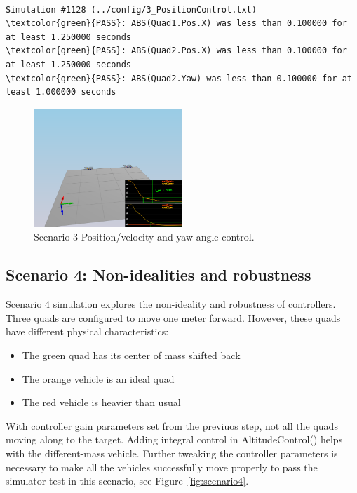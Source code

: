\documentclass[letterpaper]{article}
\begin{document}
\begin{Verbatim}[frame=lines, label=Simulator Test Result Output, commandchars=\\\{\}]

Simulation #1128 (../config/3_PositionControl.txt)
\textcolor{green}{PASS}: ABS(Quad1.Pos.X) was less than 0.100000 for at least 1.250000 seconds
\textcolor{green}{PASS}: ABS(Quad2.Pos.X) was less than 0.100000 for at least 1.250000 seconds
\textcolor{green}{PASS}: ABS(Quad2.Yaw) was less than 0.100000 for at least 1.000000 seconds
\end{Verbatim}

\begin{figure}[ht]
\centering
\includegraphics[width=0.5\textwidth]{./fig/scenario3.png}
\caption{\label{fig:scenario3} Scenario 3 Position/velocity and yaw angle control.}
\end{figure}

\subsection{Scenario 4: Non-idealities and robustness}

Scenario 4 simulation explores the non-ideality and robustness of controllers. Three quads are configured to move one meter forward. However, these quads have different physical characteristics:

\begin{itemize}
\item The green quad has its center of mass shifted back
\item The orange vehicle is an ideal quad
\item The red vehicle is heavier than usual
\end{itemize}

With controller gain parameters set from the previuos step, not all the quads  moving along to the target. Adding integral control in AltitudeControl() helps with the different-mass vehicle. Further tweaking the controller parameters is necessary to make all the vehicles successfully move properly  to pass the simulator test in this scenario, see Figure~\ref{fig:scenario4}.
\end{document}
